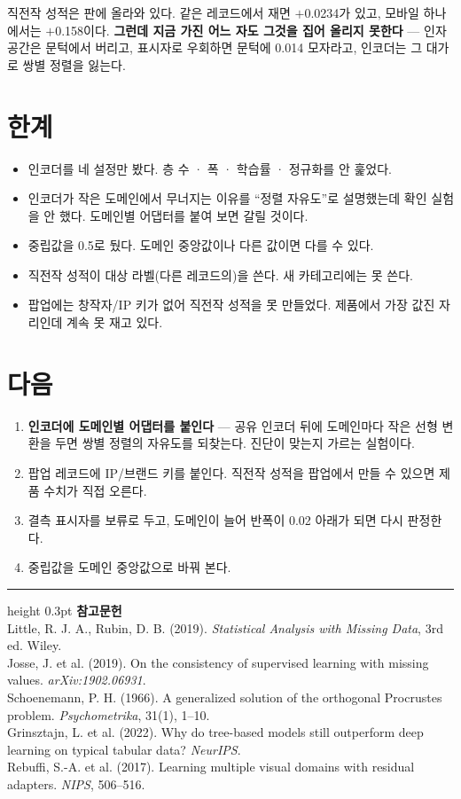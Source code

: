 \documentclass[10pt]{article}
\begin{document}
직전작 성적은 판에 올라와 있다. 같은 레코드에서 재면 $+$0.0234가 있고, 모바일
하나에서는 $+$0.158이다. \textbf{그런데 지금 가진 어느 자도 그것을 집어 올리지
못한다} --- 인자 공간은 문턱에서 버리고, 표시자로 우회하면 문턱에 0.014 모자라고,
인코더는 그 대가로 쌍별 정렬을 잃는다.

\section{한계}

\begin{itemize}[leftmargin=1.1em,itemsep=0.15em]
\item 인코더를 네 설정만 봤다. 층 수 · 폭 · 학습률 · 정규화를 안 훑었다.
\item 인코더가 작은 도메인에서 무너지는 이유를 ``정렬 자유도''로 설명했는데
      확인 실험을 안 했다. 도메인별 어댑터를 붙여 보면 갈릴 것이다.
\item 중립값을 0.5로 뒀다. 도메인 중앙값이나 다른 값이면 다를 수 있다.
\item 직전작 성적이 대상 라벨(다른 레코드의)을 쓴다. 새 카테고리에는 못 쓴다.
\item 팝업에는 창작자/IP 키가 없어 직전작 성적을 못 만들었다. 제품에서 가장
      값진 자리인데 계속 못 재고 있다.
\end{itemize}

\section{다음}

\begin{enumerate}[leftmargin=1.3em,itemsep=0.15em]
\item \textbf{인코더에 도메인별 어댑터를 붙인다} --- 공유 인코더 뒤에 도메인마다
      작은 선형 변환을 두면 쌍별 정렬의 자유도를 되찾는다. 진단이 맞는지
      가르는 실험이다.
\item 팝업 레코드에 IP/브랜드 키를 붙인다. 직전작 성적을 팝업에서 만들 수 있으면
      제품 수치가 직접 오른다.
\item 결측 표시자를 보류로 두고, 도메인이 늘어 반폭이 0.02 아래가 되면 다시
      판정한다.
\item 중립값을 도메인 중앙값으로 바꿔 본다.
\end{enumerate}

\vspace{0.6em}
\hrule height 0.3pt
\vspace{0.5em}
{\footnotesize
\textbf{참고문헌}\\[0.3em]
Little, R. J. A., Rubin, D. B. (2019). \emph{Statistical Analysis with Missing
Data}, 3rd ed. Wiley.\\[0.15em]
Josse, J. et al. (2019). On the consistency of supervised learning with missing
values. \emph{arXiv:1902.06931}.\\[0.15em]
Schoenemann, P. H. (1966). A generalized solution of the orthogonal Procrustes
problem. \emph{Psychometrika}, 31(1), 1--10.\\[0.15em]
Grinsztajn, L. et al. (2022). Why do tree-based models still outperform deep
learning on typical tabular data? \emph{NeurIPS}.\\[0.15em]
Rebuffi, S.-A. et al. (2017). Learning multiple visual domains with residual
adapters. \emph{NIPS}, 506--516.
}
\end{document}
